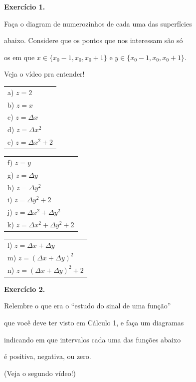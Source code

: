 \documentclass[oneside,12pt]{article}
\begin{document}
\newpage


{\bf Exercício 1.}

Faça o diagram de numerozinhos de cada uma das superfícies

abaixo. Considere que os pontos que nos interessam são só

os em que $x∈\{x_0-1, x_0, x_0+1\}$ e $y∈\{x_0-1, x_0, x_0+1\}$.

Veja o vídeo pra entender!

\msk

\begin{tabular}[t]{l}
a) $z = 2$ \\
b) $z = x$ \\
c) $z = Δx$ \\
d) $z = Δx^2$ \\
e) $z = Δx^2 + 2$ \\
\end{tabular}
\msk
\begin{tabular}[t]{l}
f) $z = y$ \\
g) $z = Δy$ \\
h) $z = Δy^2$ \\
i) $z = Δy^2 + 2$ \\
j) $z = Δx^2+Δy^2$ \\
k) $z = Δx^2+Δy^2 + 2$ \\
\end{tabular}
\msk
\begin{tabular}[t]{l}
l) $z = Δx+Δy$ \\
m) $z = (Δx+Δy)^2$ \\
n) $z = (Δx+Δy)^2 + 2$ \\
\end{tabular}

\newpage


{\bf Exercício 2.}

Relembre o que era o ``estudo do sinal de uma função''

que você deve ter visto em Cálculo 1, e faça um diagramas

indicando em que intervalos cada uma das funções abaixo

é positiva, negativa, ou zero.

(Veja o segundo vídeo!)

\msk
\end{document}
